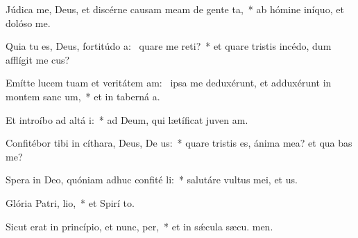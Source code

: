\item Júdica me, Deus, et discérne causam meam de gente  ta,~* ab hómine iníquo, et dolóso  me.
\item Quia tu es, Deus, fortitúdo a:~\pscross{} quare me reti?~* et quare tristis incédo, dum afflígit me cus?
\item Emítte lucem tuam et veritátem am:~\pscross{} ipsa me deduxérunt, et adduxérunt in montem sanc um,~* et in taberná a.
\item Et introíbo ad altá i:~* ad Deum, qui lætíficat juven am.
\item Confitébor tibi in cíthara, Deus, De us:~* quare tristis es, ánima mea? et qua bas me?
\item Spera in Deo, quóniam adhuc confité li:~* salutáre vultus mei, et  us.
\item Glória Patri,  lio,~* et Spirí to.
\item Sicut erat in princípio, et nunc,  per,~* et in sǽcula sæcu. men.
